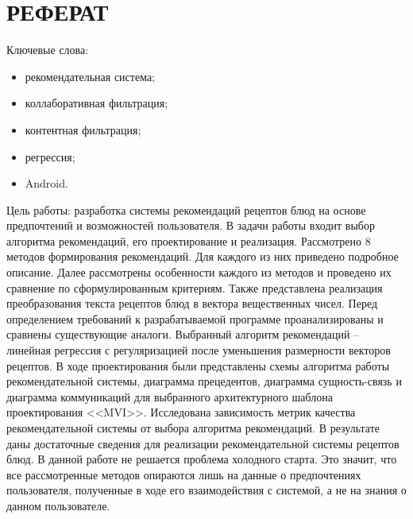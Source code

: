 \addtocounter{page}{4}

\chapter*{РЕФЕРАТ}

Ключевые слова:
\begin{itemize}
    \item рекомендательная система;
    \item коллаборативная фильтрация;
    \item контентная фильтрация;
    \item регрессия;
    \item Android.
\end{itemize}

Цель работы: разработка системы рекомендаций рецептов блюд на основе предпочтений и возможностей пользователя.
В задачи работы входит выбор алгоритма рекомендаций, его проектирование и реализация.
Рассмотрено $8$ методов формирования рекомендаций.
Для каждого из них приведено подробное описание.
Далее рассмотрены особенности каждого из методов и проведено их сравнение по сформулированным критериям.
Также представлена реализация преобразования текста рецептов блюд в вектора вещественных чисел.
Перед определением требований к разрабатываемой программе проанализированы и сравнены существующие аналоги.
Выбранный алгоритм рекомендаций -- линейная регрессия с регуляризацией после уменьшения размерности векторов рецептов.
В ходе проектирования были представлены схемы алгоритма работы рекомендательной системы, диаграмма прецедентов, диаграмма сущность-связь и диаграмма коммуникаций для выбранного архитектурного шаблона проектирования <<MVI>>.
Исследована зависимость метрик качества рекомендательной системы от выбора алгоритма рекомендаций.
В результате даны достаточные сведения для реализации рекомендательной системы рецептов блюд.
В данной работе не решается проблема холодного старта.
Это значит, что все рассмотренные методов опираются лишь на данные о предпочтениях пользователя, полученные в ходе его взаимодействия с системой, а не на знания о данном пользователе.